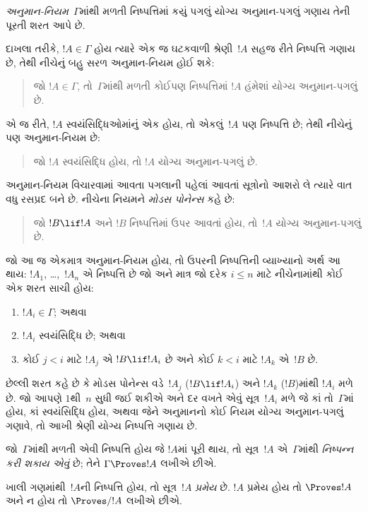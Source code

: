 \begin{defn}[અનુમાન-નિયમ]
\emph{અનુમાન-નિયમ}~$\Gamma$માંથી મળતી નિષ્પત્તિમાં કયું પગલું
યોગ્ય અનુમાન-પગલું ગણાય તેની પૂરતી શરત આપે છે.
\end{defn}

દાખલા તરીકે, $!A \in \Gamma$ હોય ત્યારે એક જ ઘટકવાળી શ્રેણી~$!A$
સહજ રીતે નિષ્પત્તિ ગણાય છે, તેથી નીચેનું બહુ સરળ અનુમાન-નિયમ હોઈ
શકે:
\begin{quote}
  જો $!A \in \Gamma$, તો~$\Gamma$માંથી મળતી કોઈપણ નિષ્પત્તિમાં
  $!A$ હંમેશાં યોગ્ય અનુમાન-પગલું છે.
\end{quote}
એ જ રીતે, $!A$ સ્વયંસિદ્ધિઓમાંનું એક હોય, તો એકલું~$!A$ પણ
નિષ્પત્તિ છે; તેથી નીચેનું પણ અનુમાન-નિયમ છે:
\begin{quote}
  જો $!A$ સ્વયંસિદ્ધિ હોય, તો $!A$ યોગ્ય અનુમાન-પગલું છે.
\end{quote}
અનુમાન-નિયમ વિચારવામાં આવતા પગલાની પહેલાં આવતાં સૂત્રોનો આશરો
લે ત્યારે વાત વધુ રસપ્રદ બને છે. નીચેના નિયમને \emph{મોડસ પોનેન્સ}
કહે છે:
\begin{quote}
  જો $!B \lif !A$ અને $!B$ નિષ્પત્તિમાં ઉપર આવતાં હોય, તો~$!A$
  યોગ્ય અનુમાન-પગલું છે.
\end{quote}
જો આ જ એકમાત્ર અનુમાન-નિયમ હોય, તો ઉપરની નિષ્પત્તિની વ્યાખ્યાનો
અર્થ આ થાય: $!A_1$, \dots,~$!A_n$ એ નિષ્પત્તિ છે જો અને માત્ર
જો દરેક $i \le n$ માટે નીચેનામાંથી કોઈ એક શરત સાચી હોય:
\begin{enumerate}
\item $!A_i \in \Gamma$; અથવા
\item $!A_i$ સ્વયંસિદ્ધિ છે; અથવા
\item કોઈ $j < i$ માટે $!A_j$ એ $!B \lif !A_i$ છે અને કોઈ $k < i$
  માટે $!A_k$ એ~$!B$ છે.
\end{enumerate}
છેલ્લી શરત કહે છે કે મોડસ પોનેન્સ વડે~$!A_j$ ($!B \lif !A_i$) અને
$!A_k$ ($!B$)માંથી $!A_i$ મળે છે. જો આપણે $1$થી~$n$ સુધી જઈ શકીએ અને
દર વખતે એવું સૂત્ર~$!A_i$ મળે જે કાં તો~$\Gamma$માં હોય, કાં
સ્વયંસિદ્ધિ હોય, અથવા જેને અનુમાનનો કોઈ નિયમ યોગ્ય અનુમાન-પગલું ગણાવે,
તો આખી શ્રેણી યોગ્ય નિષ્પત્તિ ગણાય છે.

\begin{defn}[નિષ્પન્નક્ષમતા]
જો~$\Gamma$માંથી મળતી એવી નિષ્પત્તિ હોય જે $!A$માં પૂરી થાય,
તો સૂત્ર~$!A$ એ~$\Gamma$માંથી \emph{નિષ્પન્ન કરી શકાય એવું} છે; તેને
$\Gamma \Proves !A$ લખીએ છીએ.
\end{defn}

\begin{defn}[પ્રમેયો]
ખાલી ગણમાંથી~$!A$ની નિષ્પત્તિ હોય, તો સૂત્ર~$!A$
\emph{પ્રમેય} છે. $!A$ પ્રમેય હોય તો $\Proves !A$ અને ન હોય તો
$\Proves/ !A$ લખીએ છીએ.
\end{defn}
\endgroup


